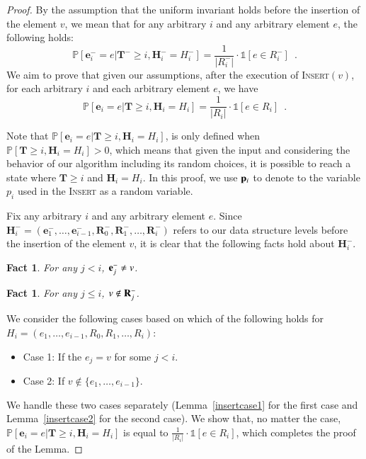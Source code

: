 \documentclass[11pt]{article}
\newtheorem{fact}[theorem]{Fact}
\renewcommand{\Pr}[1]{\ensuremath{\mathbb{P}\left[#1\right]}}
\newcommand{\ind}[1]{\ensuremath{\mathds{1}\left[#1\right]}}
\newcommand{\insertv}{{\textsc{Insert}}}
\newcommand{\bR}{\ensuremath{\mathbf{R}}}
\newcommand{\bE}{\ensuremath{\mathbf{e}}}
\newcommand{\bT}{\ensuremath{\mathbf{T}}}
\newcommand{\bH}{\ensuremath{\mathbf{H}}}
\begin{document}
\begin{proof} 
By the assumption that the uniform invariant holds before the insertion of the element $v$, we mean that for any arbitrary $i$ and any arbitrary element $e$, the following holds:
\[
    \Pr{\bE_i^- = e | \bT^- \geq i, \bH_i^- = H_i^-} = 
    \frac{1}{|R_i^{-}|} \cdot \ind{e \in R_i^{-}} \enspace.
\]
We aim to prove that given 
our assumptions,
after the execution of \insertv$(v)$, for each arbitrary $i$ and each arbitrary element $e$, we have 
\[
    \Pr{\bE_i = e | \bT \geq i, \bH_i = H_i} = 
    \frac{1}{|R_i|} \cdot \ind{e \in R_i} \enspace .
\]

Note that $\Pr{\bE_i = e | \bT \geq i, \bH_i = H_i}$, is only defined when 
$\Pr{\bT \geq i, \bH_i = H_i} > 0$, which means that given the input and considering the behavior of our algorithm including its random choices, it is possible to reach a state where $\bT \geq i$ and $\bH_i = H_i$.
In this proof, we use $\bold{p}_i$ to denote to the variable $p_i$ used in the \insertv{} as a random variable.

Fix any arbitrary $i$ and any arbitrary element $e$. Since $\bH_i^- = (\bE_1^-, \dots, \bE_{i - 1}^-, \bR_0^-, \bR_1^-, \dots, \bR_i^-)$ refers to our data structure levels before the insertion of the element $v$, it is clear that the following facts hold about $\bH_i^-$. 

\begin{fact}
\label{ebeforeinsert}
For any $j < i$, $\bold{e}_j^- \neq v$.
\end{fact}

\begin{fact}
\label{rbeforeinsert}
For any $j \leq i$, $v \notin \bold{R}_j^-$.
\end{fact}

We consider the following cases based on which of the following holds for $H_i = (e_1, \dots, e_{i - 1}, R_0, R_1, \dots, R_i)$:
\begin{itemize}
    \item Case 1: If the $e_j = v$ for some $j < i$.
    \item Case 2: If $v \notin \{e_1, \dots, e_{i - 1}\}$.
\end{itemize}

We handle these two cases separately (Lemma~\ref{insertcase1} for the first case and Lemma~\ref{insertcase2} for the second case). We show that, no matter the case, $\Pr{\bE_i = e | \bT \geq i, \bH_i = H_i}$ is equal to $\frac{1}{|R_i|} \cdot \ind{e \in R_i}$, which completes the proof of the Lemma.


\end{proof}
\end{document}
